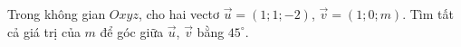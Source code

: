\begin{ex}
Trong không gian $Oxyz$, cho hai vectơ $\vec u=(1;1;-2)$, $\vec v=(1;0;m)$. Tìm tất cả giá trị của $m$ để góc giữa $\vec u$, $\vec v$ bằng $45^\circ$.
\end{ex}

